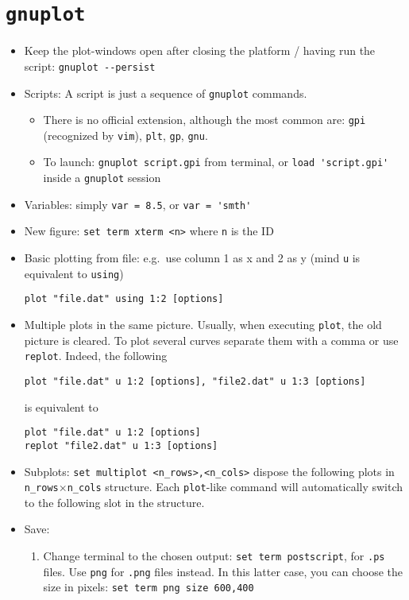 \documentclass[a4paper,12pt,%
              final%
              ]{article}
\begin{document}
\section{\texttt{gnuplot}}
\begin{itemize}
  \item Keep the plot-windows open after closing the platform / having run the script: \verb|gnuplot --persist|
  \item Scripts: A script is just a sequence of \texttt{gnuplot} commands.
    \begin{itemize}
      \item There is no official extension, although the most common are: \texttt{gpi} (recognized by \texttt{vim}), \texttt{plt}, \texttt{gp}, \texttt{gnu}.
      \item To launch: \verb|gnuplot script.gpi| from terminal, or \verb|load 'script.gpi'| inside a \verb|gnuplot| session
    \end{itemize}
  \item Variables: simply \verb|var = 8.5|, or \verb|var = 'smth'|
  \item New figure: \verb|set term xterm <n>| where \verb|n| is the ID
  \item Basic plotting from file: e.g.~use column 1 as x and 2 as y (mind \texttt{u} is equivalent to \texttt{using})
\begin{verbatim}
plot "file.dat" using 1:2 [options]
\end{verbatim}
  \item Multiple plots in the same picture. Usually, when executing \texttt{plot}, the old picture is cleared. To plot several curves separate them with a comma or use \verb|replot|. Indeed, the following
\begin{verbatim}
plot "file.dat" u 1:2 [options], "file2.dat" u 1:3 [options]
\end{verbatim}
    is equivalent to
\begin{verbatim}
plot "file.dat" u 1:2 [options]
replot "file2.dat" u 1:3 [options]
\end{verbatim}
  \item Subplots: \verb|set multiplot <n_rows>,<n_cols>| dispose the following plots in \verb|n_rows|$\times$\verb|n_cols| structure. Each \verb|plot|-like command will automatically switch to the following slot in the structure.
  \item Save:
    \begin{enumerate}
      \item Change terminal to the chosen output: \verb|set term postscript|, for \texttt{.ps} files. Use \texttt{png} for \texttt{.png} files instead. In this latter case, you can choose the size in pixels: \verb|set term png size 600,400|

\end{enumerate}
\end{itemize}
\end{document}
